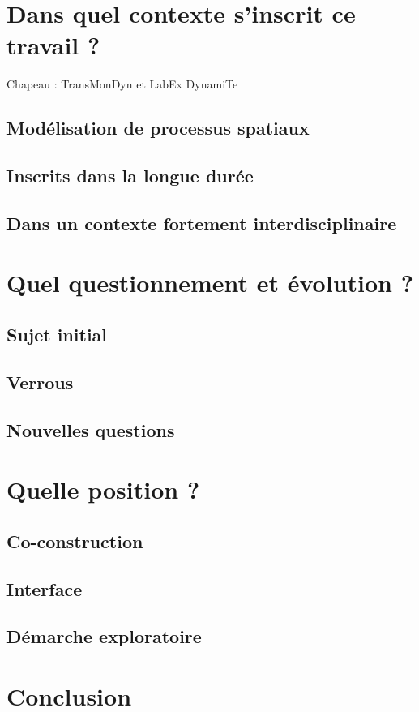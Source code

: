 \section{Dans quel contexte s'inscrit ce travail ?}

Chapeau : TransMonDyn et LabEx DynamiTe

\subsection{Modélisation de processus spatiaux}

\subsection{Inscrits dans la longue durée}

\subsection{Dans un contexte fortement interdisciplinaire}


\section{Quel questionnement et évolution ?}

\subsection{Sujet initial}

\subsection{Verrous}

\subsection{Nouvelles questions}

\section{Quelle position ?}

\subsection{Co-construction}

\subsection{Interface}

\subsection{Démarche exploratoire}

\section*{Conclusion}
